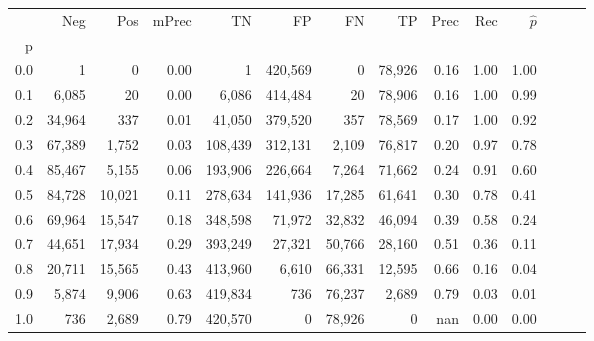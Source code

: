 \begin{tabular}{rrrrrrrrrrrrrr}
\toprule
{} &     Neg &     Pos & mPrec &       TN &       FP &      FN &      TP &  Prec &   Rec & $\hat{p}$ \\
p   &         &         &       &          &          &         &         &       &       &           \\
\midrule
0.0 &       1 &       0 &  0.00 &        1 &  420,569 &       0 &  78,926 &  0.16 &  1.00 &      1.00 \\
0.1 &   6,085 &      20 &  0.00 &    6,086 &  414,484 &      20 &  78,906 &  0.16 &  1.00 &      0.99 \\
0.2 &  34,964 &     337 &  0.01 &   41,050 &  379,520 &     357 &  78,569 &  0.17 &  1.00 &      0.92 \\
0.3 &  67,389 &   1,752 &  0.03 &  108,439 &  312,131 &   2,109 &  76,817 &  0.20 &  0.97 &      0.78 \\
0.4 &  85,467 &   5,155 &  0.06 &  193,906 &  226,664 &   7,264 &  71,662 &  0.24 &  0.91 &      0.60 \\
0.5 &  84,728 &  10,021 &  0.11 &  278,634 &  141,936 &  17,285 &  61,641 &  0.30 &  0.78 &      0.41 \\
0.6 &  69,964 &  15,547 &  0.18 &  348,598 &   71,972 &  32,832 &  46,094 &  0.39 &  0.58 &      0.24 \\
0.7 &  44,651 &  17,934 &  0.29 &  393,249 &   27,321 &  50,766 &  28,160 &  0.51 &  0.36 &      0.11 \\
0.8 &  20,711 &  15,565 &  0.43 &  413,960 &    6,610 &  66,331 &  12,595 &  0.66 &  0.16 &      0.04 \\
0.9 &   5,874 &   9,906 &  0.63 &  419,834 &      736 &  76,237 &   2,689 &  0.79 &  0.03 &      0.01 \\
1.0 &     736 &   2,689 &  0.79 &  420,570 &        0 &  78,926 &       0 &   nan &  0.00 &      0.00 \\
\bottomrule
\end{tabular}
